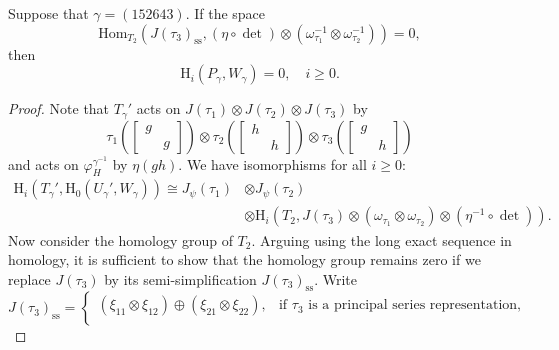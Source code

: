 \documentclass[10pt,a4paper]{amsart}
\newcommand{\Hom}{{\mathrm{Hom}}}
\newcommand{\RH}{{\mathrm {H}}}
\begin{document}
\begin{lemd}
    Suppose that $ \gamma = (152643) $. If the space
    \[
        \Hom_{T_2}
        \left(
            J( \tau_3 )_\mathrm{ss}, ( \eta \circ \det ) \otimes \left( \omega_{ \tau_1 }^{-1} \otimes \omega_{ \tau_2 }^{-1} \right)
        \right)=0,
    \]
    then 
    \[
        \RH_i \left( P_\gamma, W_\gamma \right) = 0, \quad i \ge 0.
    \]
\end{lemd}

\begin{proof}
    Note that $T_\gamma'$ acts on $ J( \tau_1 ) \otimes J( \tau_2 ) \otimes J( \tau_3 ) $ by
    \[
        \tau_1 \left(
        \begin{bmatrix}
            g &  \\
              & g
        \end{bmatrix}
        \right) \otimes \tau_2 \left( 
        \begin{bmatrix}
            h &  \\
              & h
        \end{bmatrix}
        \right) \otimes \tau_3 \left(
        \begin{bmatrix}
            g &  \\
              & h
        \end{bmatrix}
        \right)
    \]
    and acts on $ \varphi_H^{ \gamma^{-1} } $ by $ \eta(gh) $. We have isomorphisms for all $ i \ge 0 $:
    \[
        \begin{aligned}
            \RH_i
            \left(
                T_\gamma', \RH_0 ( U_\gamma', W_\gamma )
            \right)
            \cong J_\psi ( \tau_1 ) 
            &\otimes J_\psi ( \tau_2 )\\
            &\otimes \RH_i
            \left(  
                T_2, J( \tau_3 ) \otimes \left( \omega_{ \tau_1 } \otimes \omega_{ \tau_2 } \right) \otimes \left( \eta^{-1} \circ \det \right) 
            \right).
        \end{aligned}
    \]
    Now consider the homology group of $T_2$. Arguing using the long exact sequence in homology, it is sufficient to show that the homology group remains zero if we replace $ J( \tau_3 ) $ by its semi-simplification $ J( \tau_3 )_\mathrm{ss} $. Write
    \[
        J( \tau_3 )_\mathrm{ss} = 
        \begin{cases}
            ( \xi_{11} \otimes \xi_{12} ) \oplus ( \xi_{21} \otimes \xi_{22} ), & \text{if } \tau_3 \text{ is a principal series representation,}\\

\end{cases}\]
\end{proof}
\end{document}
